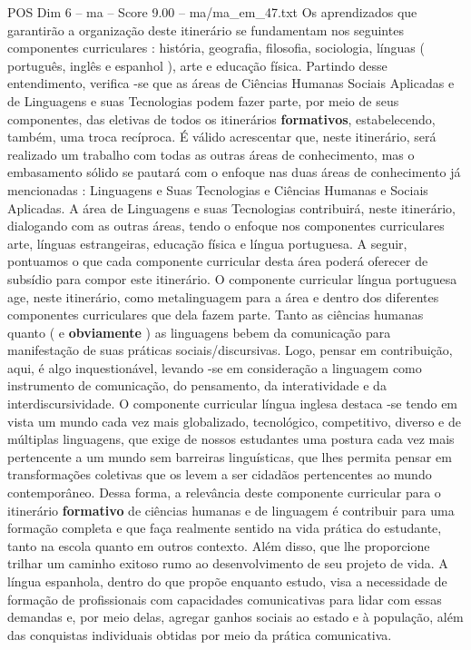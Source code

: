 \begin{textsample}{POS Dim 6 – ma – Score 9.00 – ma/ma\_em\_47.txt}
Os aprendizados que garantirão a organização deste itinerário se fundamentam nos seguintes componentes curriculares : história, geografia, filosofia, sociologia, línguas ( português, inglês e espanhol ), arte e educação física.
Partindo desse entendimento, verifica -se que as áreas de Ciências Humanas Sociais Aplicadas e de Linguagens e suas Tecnologias podem fazer parte, por meio de seus componentes, das eletivas de todos os itinerários \textbf{formativos}, estabelecendo, também, uma troca recíproca.
É válido acrescentar que, neste itinerário, será realizado um trabalho com todas as outras áreas de conhecimento, mas o embasamento sólido se pautará com o enfoque nas duas áreas de conhecimento já mencionadas : Linguagens e Suas Tecnologias e Ciências Humanas e Sociais Aplicadas.
A área de Linguagens e suas Tecnologias contribuirá, neste itinerário, dialogando com as outras áreas, tendo o enfoque nos componentes curriculares arte, línguas estrangeiras, educação física e língua portuguesa.
A seguir, pontuamos o que cada componente curricular desta área poderá oferecer de subsídio para compor este itinerário.
O componente curricular língua portuguesa age, neste itinerário, como metalinguagem para a área e dentro dos diferentes componentes curriculares que dela fazem parte.
Tanto as ciências humanas quanto ( e \textbf{obviamente} ) as linguagens bebem da comunicação para manifestação de suas práticas sociais/discursivas.
Logo, pensar em contribuição, aqui, é algo inquestionável, levando -se em consideração a linguagem como instrumento de comunicação, do pensamento, da interatividade e da interdiscursividade.
O componente curricular língua inglesa destaca -se tendo em vista um mundo cada vez mais globalizado, tecnológico, competitivo, diverso e de múltiplas linguagens, que exige de nossos estudantes uma postura cada vez mais pertencente a um mundo sem barreiras linguísticas, que lhes permita pensar em transformações coletivas que os levem a ser cidadãos pertencentes ao mundo contemporâneo.
Dessa forma, a relevância deste componente curricular para o itinerário \textbf{formativo} de ciências humanas e de linguagem é contribuir para uma formação completa e que faça realmente sentido na vida prática do estudante, tanto na escola quanto em outros contexto.
Além disso, que lhe proporcione trilhar um caminho exitoso rumo ao desenvolvimento de seu projeto de vida.
A língua espanhola, dentro do que propõe enquanto estudo, visa a necessidade de formação de profissionais com capacidades comunicativas para lidar com essas demandas e, por meio delas, agregar ganhos sociais ao estado e à população, além das conquistas individuais obtidas por meio da prática comunicativa.

\end{textsample}
